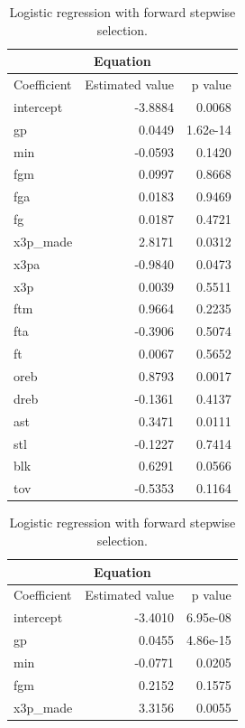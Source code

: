\begin{table}[H]
	\begin{subtable}[h]{0.4\textwidth}
		\centering
		\begin{tabular}{|| l | r | r ||} 
			\hline
			\multicolumn{3}{|c|}{Equation} \\
			\hline
			Coefficient & Estimated value & p value \\
			\hline
			intercept & -3.8884 & 0.0068 \\
			gp & 0.0449 & 1.62e-14 \\
			min & -0.0593 & 0.1420 \\
			fgm & 0.0997 & 0.8668 \\
			fga & 0.0183 & 0.9469 \\
			fg & 0.0187 & 0.4721 \\
			x3p\_made & 2.8171 & 0.0312 \\
			x3pa & -0.9840 & 0.0473 \\
			x3p & 0.0039 & 0.5511 \\
			ftm & 0.9664 & 0.2235 \\
			fta & -0.3906 & 0.5074 \\
			ft & 0.0067 & 0.5652 \\
			oreb & 0.8793 & 0.0017 \\
			dreb & -0.1361 & 0.4137 \\
			ast & 0.3471 & 0.0111 \\
			stl & -0.1227 & 0.7414 \\
			blk & 0.6291 & 0.0566 \\				
			tov & -0.5353 & 0.1164 \\		
			\hline
		\end{tabular}
		\caption{Logistic regression with forward stepwise selection.}
		\label{table:LRFSSSum}
	\end{subtable}
	\hfill
	\begin{subtable}[h]{0.4\textwidth}
		\centering
		\begin{tabular}{|| l | r | r ||} 
			\hline
			\multicolumn{3}{|c|}{Equation} \\
			\hline
			Coefficient & Estimated value & p value \\
			\hline
			intercept & -3.4010 & 6.95e-08 \\
			gp & 0.0455 & 4.86e-15 \\
			min & -0.0771 & 0.0205 \\
			fgm & 0.2152 & 0.1575 \\
			x3p\_made & 3.3156 & 0.0055 \\

\end{tabular}
\end{subtable}
\end{table}
